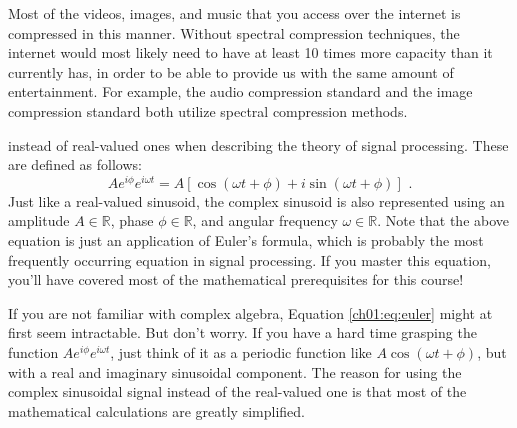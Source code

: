 Most of the videos, images, and music that you access over the
internet is compressed in this manner. Without spectral compression
techniques, the internet would most likely need to have at least 10
times more capacity than it currently has, in order to be able to
provide us with the same amount of entertainment. For example,
the  audio compression standard and
the  image compression standard both utilize spectral
compression methods.


instead of real-valued ones when describing the theory of signal
processing. These are defined as follows:
\begin{equation}
	A e^{i\phi }e^{i\omega t} = A[\cos(\omega t+\phi) + i\sin(\omega
			t+\phi)] \,\,.
	\label{ch01:eq:euler}
\end{equation}
Just like a real-valued sinusoid, the complex sinusoid is also
represented using an amplitude $A \in \mathbb{R}$, phase
$\phi \in \mathbb{R}$, and angular frequency $\omega \in \mathbb{R}$. Note
that the above equation is just an application of Euler's
formula, which is probably the most frequently occurring
equation in signal processing. If you master this equation, you'll have covered most of the mathematical prerequisites for this course!


If you are not familiar with complex algebra,
Equation \ref{ch01:eq:euler} might at first seem intractable. But
don't worry. If you have a hard time grasping the function $A e^{i\phi
		}e^{i\omega t}$, just think of it as a periodic function like
$A\cos(\omega t + \phi)$, but with a real and imaginary sinusoidal
component. The reason for using the complex sinusoidal signal instead
of the real-valued one is that most of the mathematical calculations
are greatly simplified.

